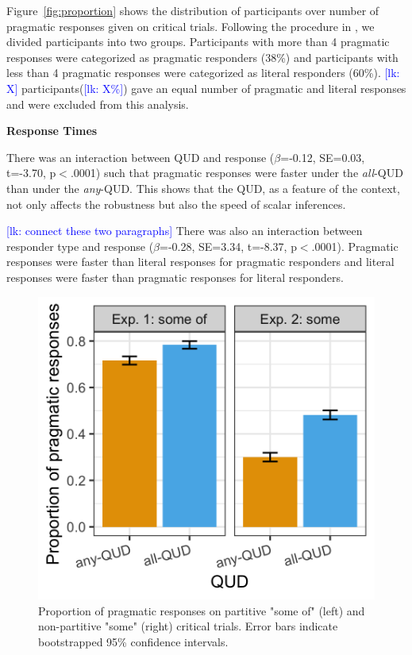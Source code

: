 \documentclass[10pt,letterpaper]{article}
\newcommand{\lk}[1]{\textcolor{Blue}{[lk: #1]}}
\begin{document}
Figure~\ref{fig:proportion} shows the distribution of participants over number of pragmatic responses given on critical trials. Following the procedure in , we divided participants into two groups. Participants with more than 4 pragmatic responses were categorized as pragmatic responders (38\%) and participants with less than 4 pragmatic responses were categorized as literal responders (60\%). \lk{X} participants(\lk{X\%}) gave an equal number of pragmatic and literal responses and were excluded from this analysis.

\noindent \textbf{Response Times} 

There was an interaction between QUD and response ($\beta$=-0.12, SE=0.03, t=-3.70, p$<$.0001) such that pragmatic responses were faster under the \textit{all}-QUD than under the \textit{any}-QUD. This shows that the QUD, as a feature of the context, not only affects the robustness but also the speed of scalar inferences. 

\lk{connect these two paragraphs}
There was also  an interaction between responder type and response ($\beta$=-0.28, SE=3.34, t=-8.37, p$<$.0001). Pragmatic responses were faster than literal responses for pragmatic responders and literal responses were faster than pragmatic responses for literal responders.

\begin{figure}
\includegraphics[width=\columnwidth]{plots/judgements.png}
\caption{Proportion of pragmatic responses on partitive "some of" (left) and non-partitive "some" (right) critical trials. Error bars indicate bootstrapped 95\% confidence intervals. \label{fig:judgements}}
\end{figure}
\end{document}
